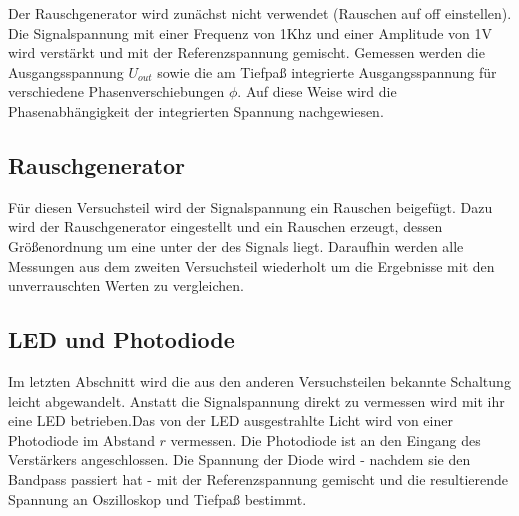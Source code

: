 Der Rauschgenerator wird zunächst nicht verwendet (Rauschen auf off einstellen).
Die Signalspannung mit einer Frequenz von 1Khz und einer Amplitude von 1V
wird verstärkt und mit der
Referenzspannung gemischt. Gemessen werden die Ausgangsspannung $U_{out}$
sowie die am Tiefpaß
integrierte Ausgangsspannung für verschiedene Phasenverschiebungen $\phi$. Auf
diese
Weise wird die Phasenabhängigkeit der integrierten Spannung nachgewiesen.

\subsection{Rauschgenerator}
Für diesen Versuchsteil wird der Signalspannung ein Rauschen beigefügt. Dazu
wird der Rauschgenerator eingestellt und ein Rauschen erzeugt, dessen
Größenordnung um eine unter der des Signals liegt. Daraufhin werden alle
Messungen aus dem zweiten Versuchsteil wiederholt um die Ergebnisse mit den
unverrauschten Werten zu vergleichen.

\subsection{LED und Photodiode}
Im letzten Abschnitt wird die aus den anderen Versuchsteilen bekannte Schaltung
leicht abgewandelt. Anstatt die Signalspannung direkt zu vermessen wird mit ihr
eine LED betrieben.Das von der LED ausgestrahlte Licht wird von einer Photodiode
im Abstand $r$ vermessen. Die Photodiode ist an den Eingang des Verstärkers
angeschlossen. Die Spannung der Diode wird
- nachdem sie den Bandpass passiert hat - mit der
Referenzspannung gemischt und die resultierende Spannung an
Oszilloskop und Tiefpaß bestimmt.
